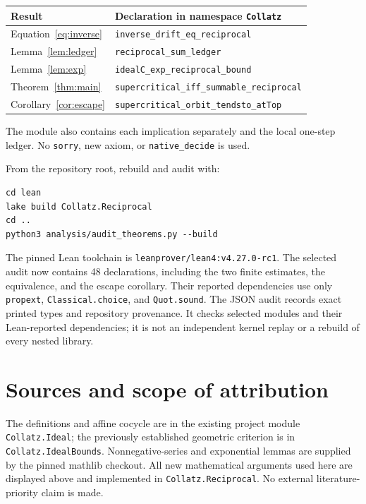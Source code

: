 \documentclass[11pt]{article}
\begin{document}
\begin{center}
\small
\begin{tabular}{lp{9.4cm}}
\toprule
Result&Declaration in namespace \texttt{Collatz}\\
\midrule
Equation~\eqref{eq:inverse}&\texttt{inverse\_drift\_eq\_reciprocal}\\
Lemma~\ref{lem:ledger}&\texttt{reciprocal\_sum\_ledger}\\
Lemma~\ref{lem:exp}&\texttt{idealC\_exp\_reciprocal\_bound}\\
Theorem~\ref{thm:main}&\texttt{supercritical\_iff\_summable\_reciprocal}\\
Corollary~\ref{cor:escape}&\texttt{supercritical\_orbit\_tendsto\_atTop}\\
\bottomrule
\end{tabular}
\end{center}
The module also contains each implication separately and the local one-step ledger. No \texttt{sorry}, new axiom, or \texttt{native\_decide} is used.

From the repository root, rebuild and audit with:
\begin{verbatim}
cd lean
lake build Collatz.Reciprocal
cd ..
python3 analysis/audit_theorems.py --build
\end{verbatim}
The pinned Lean toolchain is \texttt{leanprover/lean4:v4.27.0-rc1}. The selected audit now contains 48 declarations, including the two finite estimates, the equivalence, and the escape corollary. Their reported dependencies use only \texttt{propext}, \texttt{Classical.choice}, and \texttt{Quot.sound}. The JSON audit records exact printed types and repository provenance. It checks selected modules and their Lean-reported dependencies; it is not an independent kernel replay or a rebuild of every nested library.

\section{Sources and scope of attribution}
The definitions and affine cocycle are in the existing project module \texttt{Collatz.Ideal}; the previously established geometric criterion is in \texttt{Collatz.IdealBounds}. Nonnegative-series and exponential lemmas are supplied by the pinned mathlib checkout. All new mathematical arguments used here are displayed above and implemented in \texttt{Collatz.Reciprocal}. No external literature-priority claim is made.
\end{document}
